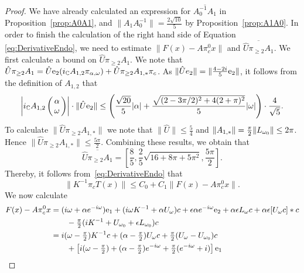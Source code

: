 \begin{proof}
	
	We have already calculated  an expression for
	 $ \overline{ A_0^{-1}A_{1}}$ in Proposition~\ref{prop:A0A1},  and  $  \| A_1 A_0^{-1}\| =\frac{2\sqrt{10}}{5}$ by Proposition~\ref{prop:A1A0}.  In order to finish the calculation of the right hand side of Equation \eqref{eq:DerivativeEndo}, we need to  estimate  $\| F(x) - A\pi_c^0 x \|$ and $\overline{\hat{U} \pi_{\ge 2} A_1} $. 
	We first calculate a bound on $\hat{U} \pi_{\ge 2} A_1 $. 
	We note that $ \hat{U} \pi_{\ge 2} A_1  =  \hat{U} \mathrm{e}_2 ( i_{\mathbb{C}} A_{1,2} \pi_{\alpha,\omega})+ \hat{U} \pi_{\ge 2}A_{1,*} \pi_c$.	
As $\|\hat{U} e_2\| = \| \tfrac{4-2i}{5} \mathrm{e}_2\|$,
it follows from the definition of $A_{1,2}$ 
that 
\[
	 \left| i_{\mathbb{C}}  A_{1,2}
	 \left( \!\!\begin{array}{c}\alpha \\ \omega \end{array} \!\!\right) \right|  
	 \cdot \| \hat{U} \mathrm{e}_2 \| 
	 \leq 
	 \left(\frac{\sqrt{20}}{5} |\alpha| +  \frac{\sqrt{(2-3 \pi/2)^2 +4(2+\pi)^2}}{5} |\omega| \right)  \cdot \frac{4}{\sqrt{5}}.
\]
	To calculate $ \| \hat{U} \pi_{\ge 2} A_{1,*} \|$ we note that $ \| \hat{U}\| \leq \frac{5}{4}$ and $ \|A_{1,*}\| = \tfrac{\pi}{2} \| L_{\omega_0} \| \leq 2 \pi$. 
	Hence $ \| \hat{U} \pi_{\ge 2} A_{1,*} \| \leq \frac{5 \pi}{2}$. 
	Combining these results, we obtain  that
	\[
	\overline{\hat{U} \pi_{\ge 2}  A_1 } = \left[\frac{8}{5},\frac{2}{5} \sqrt{16 + 8 \pi + 5 \pi^2},\frac{5 \pi }{2} \right].
	\] 
Thereby, it follows from~\eqref{eq:DerivativeEndo} that 
\begin{equation}\label{e:C0C1}
	\| K^{-1} \pi_c T(x) \| \leq C_0 + C_1 \| F(x) - A \pi_c^0 x\|. 
\end{equation}
We now calculate
	\begin{alignat*}{1}
	F(x) - A \pi_c^0 x &= 
	(i \omega + \alpha e^{-i \omega} ) \e_1 + 
	( i \omega K^{-1} + \alpha U_{\omega}) c + 
	\epsilon \alpha e^{-i \omega} \e_2  +
	\alpha \epsilon L_\omega c + 
	\alpha \epsilon [ U_{\omega} c] * c  
	\\ &\qquad 
	- \pp (i K^{-1} + U_{\omega_0} + \epsilon L_{\omega_0} ) c \\
	&= i ( \omega - \pp) K^{-1} c + ( \alpha - \pp) U_{\omega} c +  \pp ( U_{\omega} - U_{\omega_0})c  \nonumber \\
	&\qquad  + \left[i ( \omega - \pp ) + ( \alpha - \pp) e^{-i \omega} + \pp( e^{- i \omega }+ i)\right] \e_1  \nonumber

\end{alignat*}
\end{proof}
